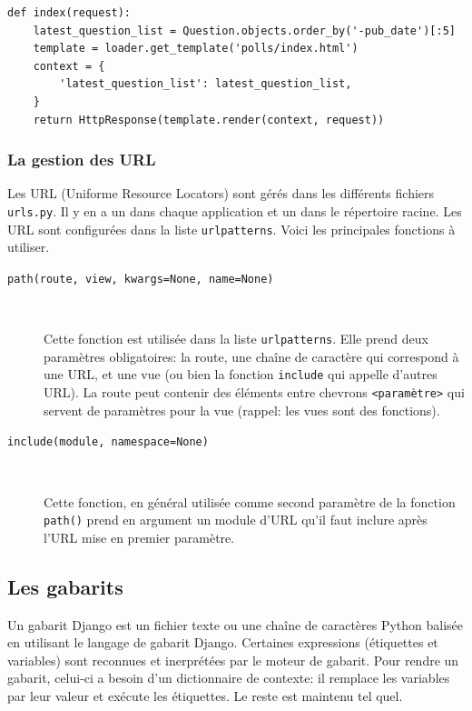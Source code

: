 \documentclass[a4paper, 10pt]{article}
\begin{document}
{\begin{verbatim}
def index(request):
    latest_question_list = Question.objects.order_by('-pub_date')[:5]
    template = loader.get_template('polls/index.html')
    context = {
        'latest_question_list': latest_question_list,
    }
    return HttpResponse(template.render(context, request))
\end{verbatim}


\subsubsection{La gestion des URL}
Les URL  (Uniforme Resource Locators) sont gérés dans les différents fichiers \texttt{urls.py}. Il y en a un dans chaque application et un dans le répertoire racine. Les URL sont configurées dans la liste \texttt{urlpatterns}. Voici les principales fonctions à utiliser.

\begin{description}
	\item[\texttt{path(route, view, kwargs=None, name=None)}]~

	      Cette fonction est utilisée dans la liste \texttt{urlpatterns}. Elle prend deux paramètres obligatoires: la route, une chaîne de caractère qui correspond à une URL, et une vue (ou bien la fonction \texttt{include} qui appelle d'autres URL). La route peut contenir des éléments entre chevrons \texttt{<paramètre>} qui servent de paramètres pour la vue (rappel: les vues sont des fonctions).

	\item[\texttt{include(module, namespace=None)}]~

	      Cette fonction, en général utilisée comme second paramètre de la fonction \texttt{path()} prend en argument un module d'URL qu'il faut inclure après l'URL mise en premier paramètre.
\end{description}


\subsection{Les gabarits}
Un gabarit Django est un fichier texte ou une chaîne de caractères Python balisée en utilisant le langage de gabarit Django. Certaines expressions (étiquettes et variables) sont reconnues et inerprétées par le moteur de gabarit. Pour rendre un gabarit, celui-ci a besoin d'un dictionnaire de contexte: il remplace les variables par leur valeur et exécute les étiquettes. Le reste est maintenu tel quel.

}
\end{document}
